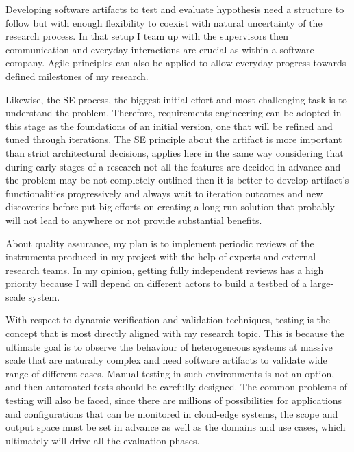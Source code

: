 \documentclass[11pt,a4paper]{article}
\begin{document}
Developing software artifacts to test and evaluate hypothesis need a structure to follow but with enough flexibility to coexist with natural uncertainty of the research process. In that setup I team up with the supervisors then communication and everyday interactions are crucial as within a software company. Agile principles can also be applied to allow everyday progress towards defined milestones of my research. 

Likewise, the SE process, the biggest initial effort and most challenging task is to understand the problem. Therefore, requirements engineering can be adopted in this stage as the foundations of an initial version, one that will be refined and tuned through iterations. The SE principle about the artifact is more important than strict architectural decisions, applies here in the same way considering that during early stages of a research not all the features are decided in advance and the problem may be not completely outlined then it is better to develop artifact's functionalities progressively and always wait to iteration outcomes and new discoveries before put big efforts on creating a long run solution that probably will not lead to anywhere or not provide substantial benefits. 

About quality assurance, my plan is to implement periodic reviews of the instruments produced in my project with the help of experts and external research teams. In my opinion, getting fully independent reviews has a high priority because I will depend on different actors to build a testbed of a large-scale system.  

With respect to dynamic verification and validation techniques, testing is the concept that is most directly aligned with my research topic. This is because the ultimate goal is to observe the behaviour of heterogeneous systems at massive scale that are naturally complex and need software artifacts to validate wide range of different cases. Manual testing in such environments is not an option, and then automated tests should be carefully designed. The common problems of testing will also be faced, since there are millions of possibilities for applications and configurations that can be monitored in cloud-edge systems, the scope and output space must be set in advance as well as the domains and use cases, which ultimately will drive all the evaluation phases. 
\\
\end{document}
